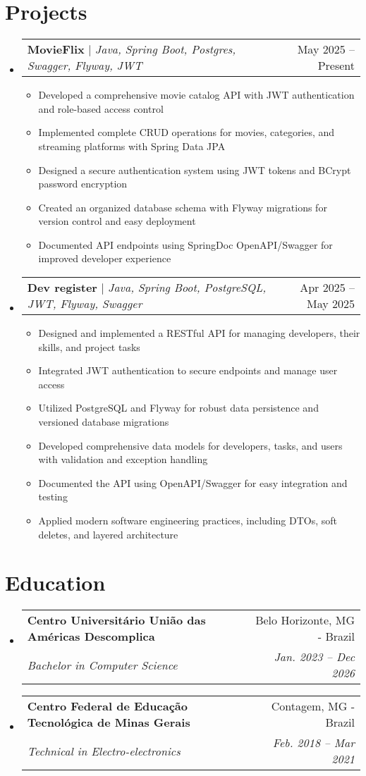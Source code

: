 \documentclass[letterpaper,11pt]{article}
\makeatletter
\newcommand{\resumeItem}[1]{
  \item\small{
    {#1 \vspace{-2pt}}
  }
}
\newcommand{\resumeSubheading}[4]{
  \vspace{-2pt}\item
    \begin{tabular*}{0.97\textwidth}[t]{l@{\extracolsep{\fill}}r}
      \textbf{#1} & #2 \\
      \textit{\small#3} & \textit{\small #4} \\
    \end{tabular*}\vspace{-7pt}
}
\newcommand{\resumeProjectHeading}[2]{
    \item
    \begin{tabular*}{0.97\textwidth}{l@{\extracolsep{\fill}}r}
      \small#1 & #2 \\
    \end{tabular*}\vspace{-7pt}
}
\newcommand{\resumeSubHeadingListStart}{\begin{itemize}[leftmargin=0.15in, label={}]}
\newcommand{\resumeSubHeadingListEnd}{\end{itemize}}
\newcommand{\resumeItemListStart}{\begin{itemize}}
\newcommand{\resumeItemListEnd}{\end{itemize}\vspace{-5pt}}
\makeatother
\begin{document}
\section{Projects}
    \resumeSubHeadingListStart
      \resumeProjectHeading
          {\textbf{MovieFlix} $|$ \emph{Java, Spring Boot, Postgres, Swagger, Flyway, JWT}}{May 2025 -- Present}
          \resumeItemListStart
            \resumeItem{Developed a comprehensive movie catalog API with JWT authentication and role-based access control}
            \resumeItem{Implemented complete CRUD operations for movies, categories, and streaming platforms with Spring Data JPA}
            \resumeItem{Designed a secure authentication system using JWT tokens and BCrypt password encryption}
            \resumeItem{Created an organized database schema with Flyway migrations for version control and easy deployment}
            \resumeItem{Documented API endpoints using SpringDoc OpenAPI/Swagger for improved developer experience}
          \resumeItemListEnd
      \resumeProjectHeading
          {\textbf{Dev register} $|$ \emph{Java, Spring Boot, PostgreSQL, JWT, Flyway, Swagger}}{Apr 2025 -- May 2025}
          \resumeItemListStart
            \resumeItem{Designed and implemented a RESTful API for managing developers, their skills, and project tasks}
            \resumeItem{Integrated JWT authentication to secure endpoints and manage user access}
            \resumeItem{Utilized PostgreSQL and Flyway for robust data persistence and versioned database migrations}
            \resumeItem{Developed comprehensive data models for developers, tasks, and users with validation and exception handling}
            \resumeItem{Documented the API using OpenAPI/Swagger for easy integration and testing}
            \resumeItem{Applied modern software engineering practices, including DTOs, soft deletes, and layered architecture}
          \resumeItemListEnd
    \resumeSubHeadingListEnd

\section{Education}
  \resumeSubHeadingListStart
    \resumeSubheading
      {Centro Universitário União das Américas Descomplica}{Belo Horizonte, MG - Brazil}
      {Bachelor in Computer Science}{Jan. 2023 -- Dec 2026}
    \resumeSubheading
      {Centro Federal de Educação Tecnológica de Minas Gerais}{Contagem, MG - Brazil}
      {Technical in Electro-electronics}{Feb. 2018 -- Mar 2021}
  \resumeSubHeadingListEnd
\end{document}
